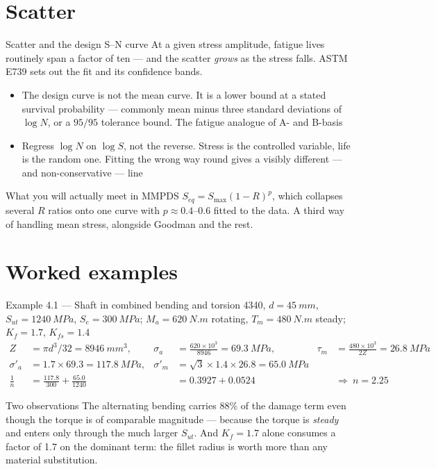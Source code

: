 \documentclass[aspectratio=169,10pt]{beamer}
\begin{document}
\section{Scatter}

\begin{frame}{Scatter and the design S--N curve}
At a given stress amplitude, fatigue lives routinely span a factor of ten --- and the scatter \emph{grows} as the stress falls. ASTM E739 sets out the fit and its confidence bands.
\vspace{4pt}
\begin{itemize}
  \item \alert{The design curve is not the mean curve.} It is a lower bound at a stated survival probability --- commonly mean minus three standard deviations of $\log N$, or a $95/95$ tolerance bound. The fatigue analogue of A- and B-basis
  \item \alert{Regress $\log N$ on $\log S$, not the reverse.} Stress is the controlled variable, life is the random one. Fitting the wrong way round gives a visibly different --- and non-conservative --- line
\end{itemize}
\vspace{4pt}
\begin{block}{What you will actually meet in MMPDS}
\footnotesize $S_{eq}=S_{\max}(1-R)^{p}$, which collapses several $R$ ratios onto one curve with $p\approx0.4$--$0.6$ fitted to the data. A third way of handling mean stress, alongside Goodman and the rest.
\end{block}
\end{frame}

\section{Worked examples}

\begin{frame}{Example 4.1 --- Shaft in combined bending and torsion}
4340, $d=\SI{45}{mm}$, $S_{ut}=\SI{1240}{MPa}$, $S_e=\SI{300}{MPa}$; $M_a=\SI{620}{N.m}$ rotating, $T_m=\SI{480}{N.m}$ steady; $K_f=1.7$, $K_{fs}=1.4$
\vspace{-2pt}
\begin{align*}
Z&=\pi d^3/32=\SI{8946}{mm^3}, &
\sigma_a&=\frac{620\times10^{3}}{8946}=\SI{69.3}{MPa}, &
\tau_m&=\frac{480\times10^{3}}{2Z}=\SI{26.8}{MPa}\\[2pt]
\sigma'_a&=1.7\times69.3=\SI{117.8}{MPa}, &
\sigma'_m&=\sqrt{3}\times1.4\times26.8=\SI{65.0}{MPa} & &\\[2pt]
\frac{1}{n}&=\frac{117.8}{300}+\frac{65.0}{1240}&&=0.3927+0.0524 &&\Rightarrow\ n=\mathbf{2.25}
\end{align*}
\begin{alertblock}{Two observations}
\footnotesize The alternating bending carries \alert{88\%} of the damage term even though the torque is of comparable magnitude --- because the torque is \emph{steady} and enters only through the much larger $S_{ut}$. And $K_f=1.7$ alone consumes a factor of 1.7 on the dominant term: \alert{the fillet radius is worth more than any material substitution}.
\end{alertblock}
\end{frame}
\end{document}
